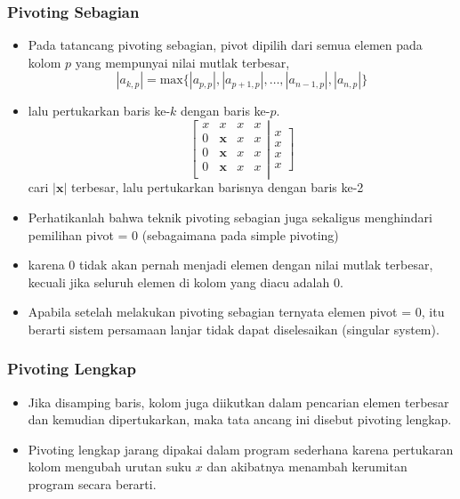 \documentclass[pdflatex,compress,mathserif]{beamer}
\begin{document}
\begin{frame}
	\frametitle{Pivoting Sebagian}
	\begin{itemize}
		\item Pada tatancang pivoting sebagian, pivot dipilih dari semua elemen pada kolom $ p $ yang mempunyai nilai mutlak terbesar,
		\[ |a_{k,p}| = \text{max}\{|a_{p,p}|,|a_{p+1,p}|,\dots,|a_{n-1,p}|, |a_{n,p}|\} \]
		\item  lalu pertukarkan baris ke-$ k $ dengan baris ke-$ p $.
		\[
		\left[
		\begin{matrix}
			x & x & x & x \\
			0 & \textbf{x} & x & x \\
			0 & \textbf{x} & x & x \\
			0 & \textbf{x} & x & x \\
		\end{matrix}
		\right|
		\left.
		\begin{matrix}
		x \\ x \\ x \\ x
		\end{matrix}
		\right]
		\] cari $ |\textbf{x}| $ terbesar, lalu pertukarkan barisnya dengan baris ke-2
	\end{itemize}
\end{frame}

\begin{frame}
	\begin{itemize}
		\item Perhatikanlah bahwa teknik pivoting sebagian juga sekaligus menghindari pemilihan pivot = 0 (sebagaimana pada simple pivoting)
		\item karena 0 tidak akan pernah menjadi elemen dengan nilai mutlak terbesar, kecuali jika seluruh elemen di kolom yang diacu adalah 0.
		\item Apabila setelah melakukan pivoting sebagian ternyata elemen pivot = 0, itu berarti sistem persamaan lanjar tidak dapat diselesaikan (singular system).
	\end{itemize}
\end{frame}

\begin{frame}
	\frametitle{Pivoting Lengkap}
	\begin{itemize}
		\item Jika disamping baris, kolom juga diikutkan dalam pencarian elemen terbesar dan kemudian dipertukarkan, maka tata ancang ini disebut pivoting lengkap.
		\item Pivoting lengkap jarang dipakai dalam program sederhana karena pertukaran kolom mengubah urutan suku $ x $ dan akibatnya menambah kerumitan program secara berarti.
	\end{itemize}
\end{frame}
\end{document}

